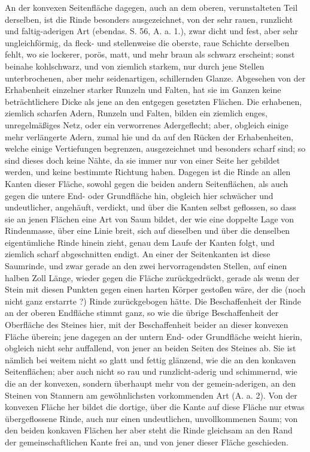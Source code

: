 \documentclass[a4paper, 11pt, oneside, german]{article}
\begin{document}
An der konvexen Seitenfläche dagegen, auch an dem oberen, verunstalteten Teil derselben, ist die Rinde besonders ausgezeichnet, von der sehr rauen, runzlicht und faltig-aderigen Art (ebendas. S. 56, A. a. 1.), zwar dicht und fest, aber sehr ungleichförmig, da fleck- und stellenweise die oberste, raue Schichte derselben fehlt, wo sie lockerer, porös, matt, und mehr braun als schwarz erscheint; sonst beinahe kohlschwarz, und von ziemlich starkem, nur durch jene Stellen unterbrochenen, aber mehr seidenartigen, schillernden Glanze. Abgesehen von der Erhabenheit einzelner starker Runzeln und Falten, hat sie im Ganzen keine beträchtlichere Dicke als jene an den entgegen gesetzten Flächen. Die erhabenen, ziemlich scharfen Adern, Runzeln und Falten, bilden ein ziemlich enges, unregelmäßiges Netz, oder ein verworrenes Adergeflecht; aber, obgleich einige mehr verlängerte Adern, zumal hie und da auf den Rücken der Erhabenheiten, welche einige Vertiefungen begrenzen, ausgezeichnet und besonders scharf sind; so sind dieses doch keine Nähte, da sie immer nur von einer Seite her gebildet werden, und keine bestimmte Richtung haben. Dagegen ist die Rinde an allen Kanten dieser Fläche, sowohl gegen die beiden andern Seitenflächen, als auch gegen die untere End- oder Grundfläche hin, obgleich hier schwächer und undeutlicher, angehäuft, verdickt, und über die Kanten selbst geflossen, so dass sie an jenen Flächen eine Art von Saum bildet, der wie eine doppelte Lage von Rindenmasse, über eine Linie breit, sich auf dieselben und über die denselben eigentümliche Rinde hinein zieht, genau dem Laufe der Kanten folgt, und ziemlich scharf abgeschnitten endigt. An einer der Seitenkanten ist diese Saumrinde, und zwar gerade an den zwei hervorragendsten Stellen, auf einen halben Zoll Länge, wieder gegen die Fläche zurückgedrückt, gerade als wenn der Stein mit diesen Punkten gegen einen harten Körper gestoßen wäre, der die (noch nicht ganz erstarrte ?) Rinde zurückgebogen hätte. Die Beschaffenheit der Rinde an der oberen Endfläche stimmt ganz, so wie die übrige Beschaffenheit der Oberfläche des Steines hier, mit der Beschaffenheit beider an dieser konvexen Fläche überein; jene dagegen an der untern End- oder Grundfläche weicht hierin, obgleich nicht sehr auffallend, von jener an beiden Seiten des Steines ab. Sie ist nämlich bei weitem nicht so glatt und fettig glänzend, wie die an den konkaven Seitenflächen; aber auch nicht so rau und runzlicht-aderig und schimmernd, wie die an der konvexen, sondern überhaupt mehr von der gemein-aderigen, an den Steinen von Stannern am gewöhnlichsten vorkommenden Art (A. a. 2). Von der konvexen Fläche her bildet die dortige, über die Kante auf diese Fläche nur etwas übergeflossene Rinde, auch nur einen undeutlichen, unvollkommenen Saum; von den beiden konkaven Flächen her aber steht die Rinde gleichsam an den Rand der gemeinschaftlichen Kante frei an, und von jener dieser Fläche geschieden.
\end{document}
